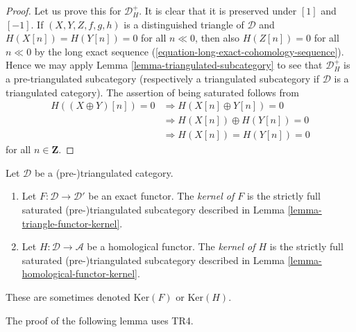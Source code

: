 \begin{proof}
Let us prove this for $\mathcal{D}_H^{+}$.
It is clear that it is preserved under $[1]$ and $[-1]$.
If $(X, Y, Z, f, g, h)$ is a distinguished triangle of $\mathcal{D}$
and $H(X[n]) = H(Y[n]) = 0$ for all $n \ll 0$, then also $H(Z[n]) = 0$
for all $n \ll 0$ by the long exact sequence
(\ref{equation-long-exact-cohomology-sequence}).
Hence we may apply
Lemma \ref{lemma-triangulated-subcategory}
to see that $\mathcal{D}_H^{+}$ is a pre-triangulated subcategory
(respectively a triangulated subcategory if $\mathcal{D}$ is a
triangulated category). The assertion of being saturated follows from
\begin{align*}
H((X \oplus Y)[n]) = 0 & \Rightarrow H(X[n] \oplus Y[n]) = 0 \\
& \Rightarrow H(X[n]) \oplus H(Y[n]) = 0 \\
& \Rightarrow H(X[n]) = H(Y[n]) = 0
\end{align*}
for all $n \in \mathbf{Z}$.
\end{proof}

\begin{definition}
\label{definition-kernel-category}
Let $\mathcal{D}$ be a (pre-)triangulated category.
\begin{enumerate}
\item Let $F : \mathcal{D} \to \mathcal{D}'$ be an exact functor.
The {\it kernel of $F$} is the strictly full saturated
(pre-)triangulated subcategory described in
Lemma \ref{lemma-triangle-functor-kernel}.
\item Let $H : \mathcal{D} \to \mathcal{A}$ be a homological functor.
The {\it kernel of $H$} is the strictly full saturated
(pre-)triangulated subcategory described in
Lemma \ref{lemma-homological-functor-kernel}.
\end{enumerate}
These are sometimes denoted $\text{Ker}(F)$ or $\text{Ker}(H)$.
\end{definition}

\noindent
The proof of the following lemma uses TR4.

